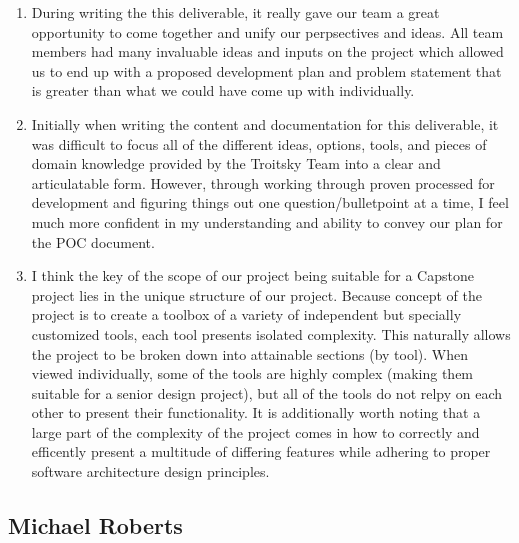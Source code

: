 \documentclass{article}
\begin{document}
\begin{enumerate}
    \item During writing the this deliverable, it really gave our team a great opportunity to come together and unify our perpsectives and ideas. All team members had many invaluable ideas and inputs on the project which allowed us to end up with a proposed development plan and problem statement that is greater than what we could have come up with individually.

    \item Initially when writing the content and documentation for this deliverable, it was difficult to focus all of the different ideas, options, tools, and pieces of domain knowledge provided by the Troitsky Team into a clear and articulatable form. However, through working through proven processed for development and figuring things out one question/bulletpoint at a time, I feel much more confident in my understanding and ability to convey our plan for the POC document.

    \item I think the key of the scope of our project being suitable for a Capstone project lies in the unique structure of our project. Because concept of the project is to create a toolbox of a variety of independent but specially customized tools, each tool presents isolated complexity. This naturally allows the project to be broken down into attainable sections (by tool). When viewed individually, some of the tools are highly complex (making them suitable for a senior design project), but all of the tools do not relpy on each other to present their functionality. It is additionally worth noting that a large part of the complexity of the project comes in how to correctly and efficently present a multitude of differing features while adhering to proper software architecture design principles.
\end{enumerate} 
\subsection*{Michael Roberts}
\end{document}

